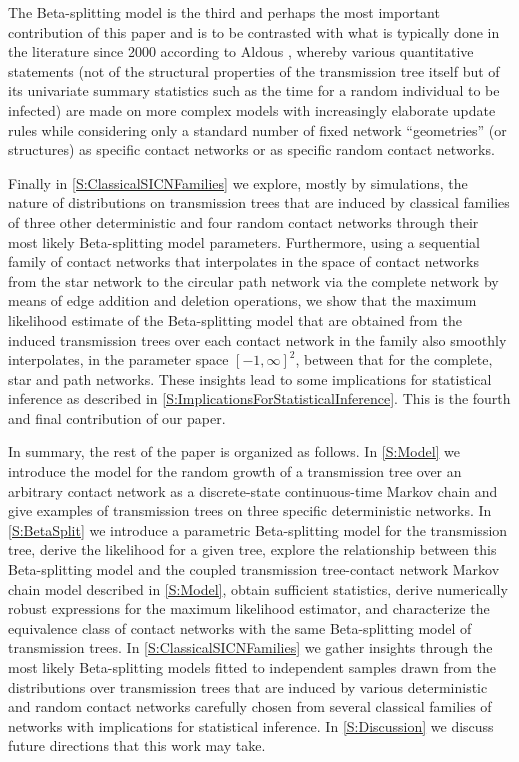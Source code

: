 \documentclass[review]{elsarticle}
\numberwithin{equation}{section}
\let\orgautoref\autoref
\renewcommand{\autoref}
        {\def\equationautorefname{Eq.}%
         \def\figureautorefname{Fig.}%
         \def\subfigureautorefname{Fig.}%
         \def\sectionautorefname{Sect.}%
         \def\subsectionautorefname{Sect.}%
         \def\subsubsectionautorefname{Sect.}%
         \def\Itemautorefname{item}%
         \def\tableautorefname{Table}%
         \def\propositionautorefname{Prop.}%
         \def\corollaryautorefname{Corollary}%
         \def\theoremautorefname{Theorem}%
         \def\remarkautorefname{Remark}%
         \def\lemmaautorefname{Lemma}%
         \def\proofofautorefname{Proof}%
         \def\exampleautorefname{Example}%
         \orgautoref}
\begin{document}
The Beta-splitting model is the third and perhaps the most important contribution of this paper and is to be contrasted with what is typically done in the literature since 2000 according to Aldous \cite[Sec.~2.4]{AldousIPSSSD2013}, whereby various quantitative statements (not of the structural properties of the transmission tree itself but of its univariate summary statistics such as the time for a random individual to be infected) are made on more complex models with increasingly elaborate update rules while considering only a standard number of fixed network ``geometries'' (or structures) as specific contact networks or as specific random contact networks. 

Finally in \autoref{S:ClassicalSICNFamilies} we explore, mostly by simulations, the nature of distributions on transmission trees that are induced by classical families of three other deterministic and four random contact networks through their most likely Beta-splitting model parameters.  
Furthermore, using a sequential family of contact networks that interpolates in the space of contact networks from the star network to the circular path network via the complete network by means of edge addition and deletion operations, we show that the maximum likelihood estimate of the Beta-splitting model that are obtained from the induced transmission trees over each contact network in the family also smoothly interpolates, in the parameter space $[-1,\infty]^2$, between that for the complete, star and path networks. 
These insights lead to some implications for statistical inference as described in \autoref{S:ImplicationsForStatisticalInference}.  This is the fourth and final contribution of our paper.

In summary, the rest of the paper is organized as follows.  
In \autoref{S:Model} we introduce the model for the random growth of a transmission tree over an arbitrary contact network as a discrete-state continuous-time Markov chain and give examples of transmission trees on three specific deterministic networks.  
In \autoref{S:BetaSplit} we introduce a parametric Beta-splitting model for the  transmission tree, derive the likelihood for a given tree, explore the relationship between this Beta-splitting model and the coupled transmission tree-contact network Markov chain model described in \autoref{S:Model}, obtain sufficient statistics, derive numerically robust expressions for the maximum likelihood estimator, and characterize the equivalence class of contact networks with the same Beta-splitting model of transmission trees.  
In \autoref{S:ClassicalSICNFamilies} we gather insights through the most likely Beta-splitting models fitted to independent samples drawn from the distributions over transmission trees that are induced by various deterministic and random contact networks carefully chosen from several classical families of networks with implications for statistical inference.  
In \autoref{S:Discussion} we discuss future directions that this work may take.
\end{document}
